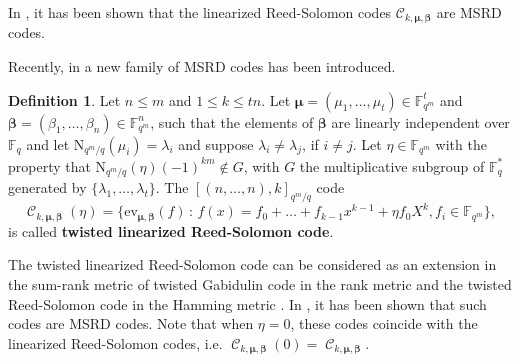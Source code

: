 \documentclass[11pt]{amsart}
\DeclareMathOperator{\C}{\mathcal{C}}
\theoremstyle{definition}
\newtheorem{definition}[theorem]{Definition}
\newcommand{\F}{{\mathbb F}}
\newcommand{\muu}{{\boldsymbol{\mu}}}
\newcommand{\N}{\mathrm{N}}
\newcommand{\st}{\,:\,}
\begin{document}
In \cite[Theorem 4]{Martinez2018skew}, it has been shown that the linearized Reed-Solomon codes $\mathcal{C}_{k,\muu,\boldsymbol{\beta}}$ are MSRD codes.

Recently, in \cite{neri2022twisted} a new family of MSRD codes has been introduced.

\begin{definition} %
Let $n \leq m$ and $1 \leq k \leq tn$. Let $\boldsymbol{\mu}=(\mu_1,\ldots,\mu_t) \in \F_{q^m}^t$ and $\boldsymbol{\beta}=(\beta_1,\ldots,\beta_n) \in \F_{q^m}^n$, such that the elements of $\boldsymbol{\beta}$ are linearly independent over $\F_q$ and let $\N_{q^m/q}(\mu_i) = \lambda_i$ and suppose $\lambda_i \neq \lambda_j$, if $i \neq j$. Let $\eta \in \F_{q^m}$ with the property that $\N_{q^m/q}(\eta)(-1)^{km} \notin G$, with $G$ the multiplicative subgroup of $\F_{q}^*$ generated by $\{\lambda_1,\ldots,\lambda_t\}$.
The $[(n,\ldots,n),k]_{q^m/q}$ code
\[
\C_{k,\muu,\boldsymbol{\beta}}(\eta)=\{ \mathrm{ev}_{\muu,\boldsymbol{\beta}}(f) \st f(x)=f_0+\ldots+f_{k-1}x^{k-1}+\eta f_0 X^k, f_i \in \F_{q^m} \}, 
\]
is called \textbf{twisted linearized Reed-Solomon code}.
\end{definition}

The twisted linearized Reed-Solomon code can be considered as an extension in the sum-rank metric of twisted Gabidulin code in the rank metric \cite{sheekey2016new, lunardon2018generalized} and the twisted Reed-Solomon code in the Hamming metric \cite{beelen2017twisted}. In \cite[Theorem 6.3]{neri2022twisted}, it has been shown that such codes are MSRD codes. Note that when $\eta=0$, these codes coincide with the linearized Reed-Solomon codes, i.e. $\C_{k,\muu,\boldsymbol{\beta}}(0)=\C_{k,\muu,\boldsymbol{\beta}}$.
\end{document}
